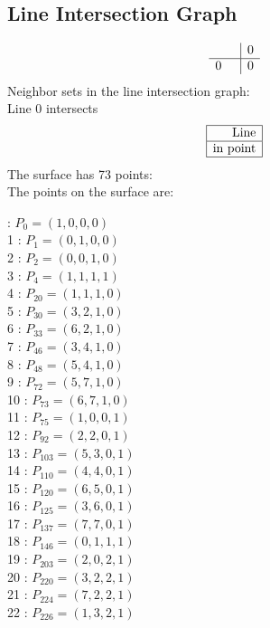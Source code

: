 \documentclass{article}
\begin{document}
{\subsection*{Line Intersection Graph}
{\arraycolsep=1pt
$$
\begin{array}{rr|*{1}r}
 &  & 0\\
\hline
0 &  & 0\\
\end{array}
$$
}%
Neighbor sets in the line intersection graph:\\
Line 0 intersects 
$$
\begin{array}{|r*{0}{|c}|}
\hline
\mbox{Line} \\
\hline
\mbox{in point} \\
\hline
\end{array}
$$
The surface has 73 points:\\
The points on the surface are:\\
\begin{multicols}{3}
 : $P_{0}=( 1, 0, 0, 0 )$\\
1 : $P_{1}=( 0, 1, 0, 0 )$\\
2 : $P_{2}=( 0, 0, 1, 0 )$\\
3 : $P_{4}=( 1, 1, 1, 1 )$\\
4 : $P_{20}=( 1, 1, 1, 0 )$\\
5 : $P_{30}=( 3, 2, 1, 0 )$\\
6 : $P_{33}=( 6, 2, 1, 0 )$\\
7 : $P_{46}=( 3, 4, 1, 0 )$\\
8 : $P_{48}=( 5, 4, 1, 0 )$\\
9 : $P_{72}=( 5, 7, 1, 0 )$\\
10 : $P_{73}=( 6, 7, 1, 0 )$\\
11 : $P_{75}=( 1, 0, 0, 1 )$\\
12 : $P_{92}=( 2, 2, 0, 1 )$\\
13 : $P_{103}=( 5, 3, 0, 1 )$\\
14 : $P_{110}=( 4, 4, 0, 1 )$\\
15 : $P_{120}=( 6, 5, 0, 1 )$\\
16 : $P_{125}=( 3, 6, 0, 1 )$\\
17 : $P_{137}=( 7, 7, 0, 1 )$\\
18 : $P_{146}=( 0, 1, 1, 1 )$\\
19 : $P_{203}=( 2, 0, 2, 1 )$\\
20 : $P_{220}=( 3, 2, 2, 1 )$\\
21 : $P_{224}=( 7, 2, 2, 1 )$\\
22 : $P_{226}=( 1, 3, 2, 1 )$\\

\end{multicols}}
\end{document}
